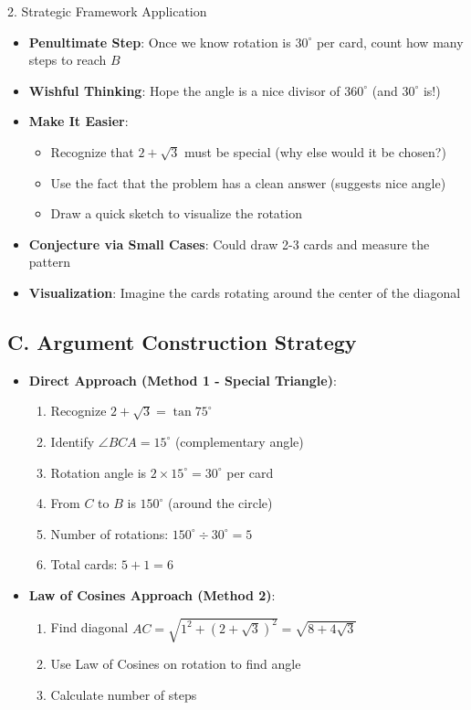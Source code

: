 \documentclass[12pt]{article}
\begin{document}
\begin{strategybox}{2. Strategic Framework Application}
\begin{itemize}[leftmargin=*]
    \item \textbf{Penultimate Step}: Once we know rotation is $30^\circ$ per card, count how many steps to reach $B$
    
    \item \textbf{Wishful Thinking}: Hope the angle is a nice divisor of $360^\circ$ (and $30^\circ$ is!)
    
    \item \textbf{Make It Easier}: 
    \begin{itemize}
        \item Recognize that $2+\sqrt{3}$ must be special (why else would it be chosen?)
        \item Use the fact that the problem has a clean answer (suggests nice angle)
        \item Draw a quick sketch to visualize the rotation
    \end{itemize}
    
    \item \textbf{Conjecture via Small Cases}: Could draw 2-3 cards and measure the pattern
    
    \item \textbf{Visualization}: Imagine the cards rotating around the center of the diagonal
\end{itemize}

\subsection*{C. Argument Construction Strategy}
\begin{itemize}[leftmargin=*]
    \item \textbf{Direct Approach (Method 1 - Special Triangle)}: 
    \begin{enumerate}
        \item Recognize $2+\sqrt{3} = \tan 75^\circ$
        \item Identify $\angle BCA = 15^\circ$ (complementary angle)
        \item Rotation angle is $2 \times 15^\circ = 30^\circ$ per card
        \item From $C$ to $B$ is $150^\circ$ (around the circle)
        \item Number of rotations: $150^\circ \div 30^\circ = 5$
        \item Total cards: $5 + 1 = 6$
    \end{enumerate}
    
    \item \textbf{Law of Cosines Approach (Method 2)}:
    \begin{enumerate}
        \item Find diagonal $AC = \sqrt{1^2 + (2+\sqrt{3})^2} = \sqrt{8 + 4\sqrt{3}}$
        \item Use Law of Cosines on rotation to find angle
        \item Calculate number of steps
    \end{enumerate}
    

\end{itemize}
\end{strategybox}
\end{document}
